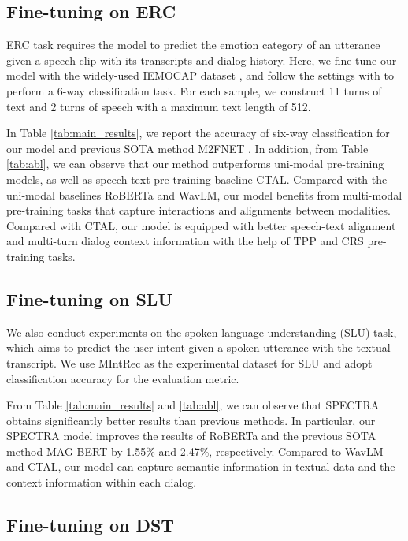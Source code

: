\documentclass[11pt]{article}
\begin{document}
\subsection{Fine-tuning on ERC}


ERC task requires the model to predict the emotion category of an utterance given a speech clip with its transcripts and dialog history. 
Here, we fine-tune our model with the widely-used IEMOCAP dataset \citep{iemocap}, and follow the settings with \citet{chudasama2022m2fnet} to perform a 6-way classification task. 
For each sample, we construct 11 turns of text and 2 turns of speech with a maximum text length of 512.


In Table \ref{tab:main_results}, we report the accuracy of six-way classification for our model and previous SOTA method M2FNET \citep{chudasama2022m2fnet}.
In addition, from Table \ref{tab:abl}, we can observe that our method outperforms uni-modal pre-training models, as well as speech-text pre-training baseline CTAL. 
Compared with the uni-modal baselines RoBERTa and WavLM, our model benefits from multi-modal pre-training tasks that capture interactions and alignments between modalities.
Compared with CTAL, our model is equipped with better speech-text alignment and multi-turn dialog context information with the help of TPP and CRS pre-training tasks. 








\subsection{Fine-tuning on SLU}
We also conduct experiments on the spoken language understanding (SLU) task, 
which aims to predict the user intent \cite{lin2019deep} given a spoken utterance with the textual transcript. 
We use MIntRec \citep{mintrec} as the experimental dataset for SLU and adopt classification accuracy for the evaluation metric. 


From Table \ref{tab:main_results} and \ref{tab:abl}, we can observe that SPECTRA obtains significantly better results than previous methods. In particular, our SPECTRA model improves the results of RoBERTa and the previous SOTA method MAG-BERT \citep{rahman2020integrating} by 1.55\% and 2.47\%, respectively. 
Compared to WavLM and CTAL, our model can capture semantic information in textual data and the context information within each dialog. 


\subsection{Fine-tuning on DST}
\label{sec:spokenwoz}
\end{document}
